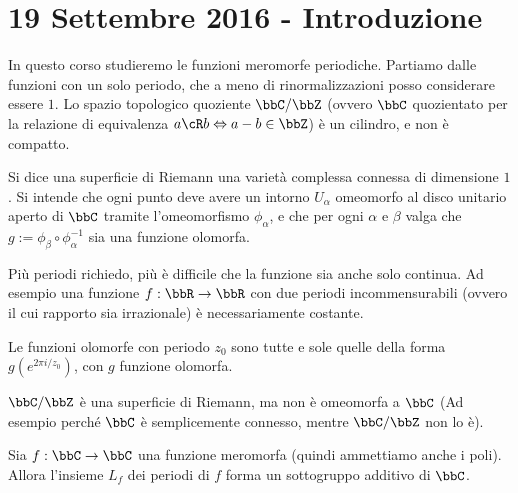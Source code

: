 \chapter{19 Settembre 2016 - Introduzione}
\justify

In questo corso studieremo le funzioni meromorfe periodiche.  Partiamo dalle funzioni con un solo periodo, che a meno di rinormalizzazioni
posso considerare essere $1$.  Lo spazio topologico quoziente $\bbC / \bbZ$ (ovvero $\bbC$ quozientato per la relazione di equivalenza
$a \cR b \sse a-b \in \bbZ$) è un cilindro, e non è compatto.

\begin{definizione}
  Si dice una superficie di Riemann una varietà complessa connessa di dimensione $1$.  Si intende che ogni punto deve avere un intorno
  $U_\alpha$ omeomorfo al disco unitario aperto di $\bbC$ tramite l'omeomorfismo $\phi_\alpha$, e che per ogni $\alpha$ e $\beta$ valga
  che $g := \phi_\beta \circ \phi_\alpha^{-1}$ sia una funzione olomorfa.
\end{definizione}


\begin{osservazione}
  Più periodi richiedo, più è difficile che la funzione sia anche solo continua. Ad esempio una funzione $f: \bbR \rar \bbR$ con due periodi
  incommensurabili (ovvero il cui rapporto sia irrazionale) è necessariamente costante.
\end{osservazione}

\begin{esercizio}
  Le funzioni olomorfe con periodo $z_0$ sono tutte e sole quelle della forma $g(e^{2\pi i/z_0})$, con $g$ funzione olomorfa.
\end{esercizio}

\begin{osservazione}
  $\bbC / \bbZ$ è una superficie di Riemann, ma non è omeomorfa a $\bbC$ (Ad esempio perché $\bbC$ è semplicemente connesso, mentre
  $\bbC / \bbZ$ non lo è).
\end{osservazione}

\begin{lemma}
  Sia $f: \bbC \rar \bbC$ una funzione meromorfa (quindi ammettiamo anche i poli).  Allora l'insieme $L_f$ dei periodi di $f$ forma un
  sottogruppo additivo di $\bbC$.

\end{lemma}


